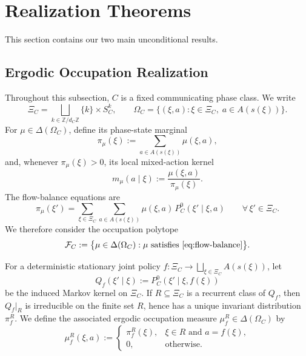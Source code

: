 \documentclass[12pt,a4paper]{article}
\theoremstyle{definition}
\newcommand{\Z}{\mathbb{Z}}
\begin{document}
\section{Realization Theorems}
\label{sec:realization}

This section contains our two main unconditional results.

\subsection{Ergodic Occupation Realization}

Throughout this subsection, $C$ is a fixed communicating phase class. We write
\[
\Xi_C = \bigsqcup_{k \in \Z/d_C\Z} \{k\} \times S_C^k,
\qquad
\Omega_C = \{(\xi, a) : \xi \in \Xi_C,\; a \in A(s(\xi))\}.
\]
For $\mu \in \Delta(\Omega_C)$, define its phase-state marginal
\[
\pi_\mu(\xi) := \sum_{a \in A(s(\xi))} \mu(\xi, a),
\]
and, whenever $\pi_\mu(\xi) > 0$, its local mixed-action kernel
\[
m_\mu(a \mid \xi) := \frac{\mu(\xi, a)}{\pi_\mu(\xi)}.
\]
The flow-balance equations are
\begin{equation}\label{eq:flow-balance}
\pi_\mu(\xi') = \sum_{\xi \in \Xi_C} \sum_{a \in A(s(\xi))} \mu(\xi, a)\, P_C^0(\xi' \mid \xi, a)
\qquad \forall\, \xi' \in \Xi_C.
\end{equation}
We therefore consider the occupation polytope
\begin{equation}\label{eq:occupation-polytope}
\mathcal{F}_C := \bigl\{\mu \in \Delta(\Omega_C) : \mu \text{ satisfies } \eqref{eq:flow-balance}\bigr\}.
\end{equation}

For a deterministic stationary joint policy $f \colon \Xi_C \to \bigsqcup_{\xi \in \Xi_C} A(s(\xi))$, let
\begin{equation}\label{eq:Qf}
Q_f(\xi' \mid \xi) := P_C^0(\xi' \mid \xi, f(\xi))
\end{equation}
be the induced Markov kernel on $\Xi_C$. If $R \subseteq \Xi_C$ is a recurrent class of $Q_f$, then $Q_f|_R$ is irreducible on the finite set $R$, hence has a unique invariant distribution $\pi_f^R$. We define the associated ergodic occupation measure $\mu_f^R \in \Delta(\Omega_C)$ by
\begin{equation}\label{eq:ergodic-occupation}
\mu_f^R(\xi, a) :=
\begin{cases}
\pi_f^R(\xi), & \xi \in R \text{ and } a = f(\xi),\\
0, & \text{otherwise}.
\end{cases}
\end{equation}
\end{document}
